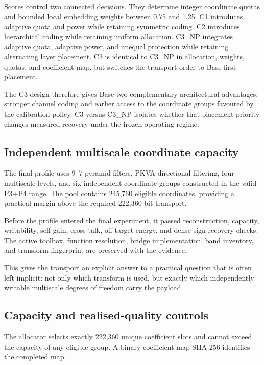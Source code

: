 Scores control two connected decisions. They determine integer coordinate quotas and bounded local embedding weights between 0.75 and 1.25. C1 introduces adaptive quota and power while retaining symmetric coding. C2 introduces hierarchical coding while retaining uniform allocation. C3\_NP integrates adaptive quota, adaptive power, and unequal protection while retaining alternating layer placement. C3 is identical to C3\_NP in allocation, weights, quotas, and coefficient map, but switches the transport order to Base-first placement.

The C3 design therefore gives Base two complementary architectural advantages: stronger channel coding and earlier access to the coordinate groups favoured by the calibration policy. C3 versus C3\_NP isolates whether that placement priority changes measured recovery under the frozen operating regime.

\subsection{Independent multiscale coordinate capacity}

The final profile uses 9--7 pyramid filters, PKVA directional filtering, four multiscale levels, and six independent coordinate groups constructed in the valid P3+P4 range. The pool contains 245,760 eligible coordinates, providing a practical margin above the required 222,360-bit transport.

Before the profile entered the final experiment, it passed reconstruction, capacity, writability, self-gain, cross-talk, off-target-energy, and dense sign-recovery checks. The active toolbox, function resolution, bridge implementation, band inventory, and transform fingerprint are preserved with the evidence.

This gives the transport an explicit answer to a practical question that is often left implicit: not only which transform is used, but exactly which independently writable multiscale degrees of freedom carry the payload.

\subsection{Capacity and realised-quality controls}

The allocator selects exactly 222,360 unique coefficient slots and cannot exceed the capacity of any eligible group. A binary coefficient-map SHA-256 identifies the completed map.

